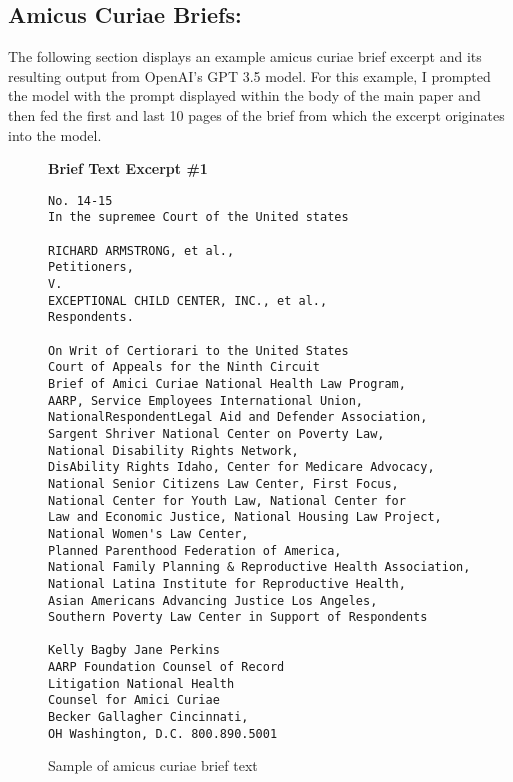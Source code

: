 \subsection{Amicus Curiae Briefs:}
The following section displays an example amicus curiae brief excerpt and its resulting output from OpenAI's GPT 3.5 model. For this example, I prompted the model with the prompt displayed within the body of the main paper and then fed the first and last 10 pages of the brief from which the excerpt originates into the model.

\begin{figure}[H]
\centering
\textbf{Brief Text Excerpt \#1}\par\medskip
\begin{lstlisting}[]
No. 14-15
In the supremee Court of the United states

RICHARD ARMSTRONG, et al.,
Petitioners,
V.
EXCEPTIONAL CHILD CENTER, INC., et al.,
Respondents.

On Writ of Certiorari to the United States
Court of Appeals for the Ninth Circuit
Brief of Amici Curiae National Health Law Program,
AARP, Service Employees International Union, 
NationalRespondentLegal Aid and Defender Association, 
Sargent Shriver National Center on Poverty Law, 
National Disability Rights Network, 
DisAbility Rights Idaho, Center for Medicare Advocacy, 
National Senior Citizens Law Center, First Focus, 
National Center for Youth Law, National Center for 
Law and Economic Justice, National Housing Law Project, 
National Women's Law Center, 
Planned Parenthood Federation of America, 
National Family Planning & Reproductive Health Association, 
National Latina Institute for Reproductive Health, 
Asian Americans Advancing Justice Los Angeles, 
Southern Poverty Law Center in Support of Respondents

Kelly Bagby Jane Perkins
AARP Foundation Counsel of Record
Litigation National Health
Counsel for Amici Curiae
Becker Gallagher Cincinnati, 
OH Washington, D.C. 800.890.5001
\end{lstlisting}
\caption[Amicus Curiae Brief Example Output \#1]{Sample of amicus curiae brief text}
\end{figure}

